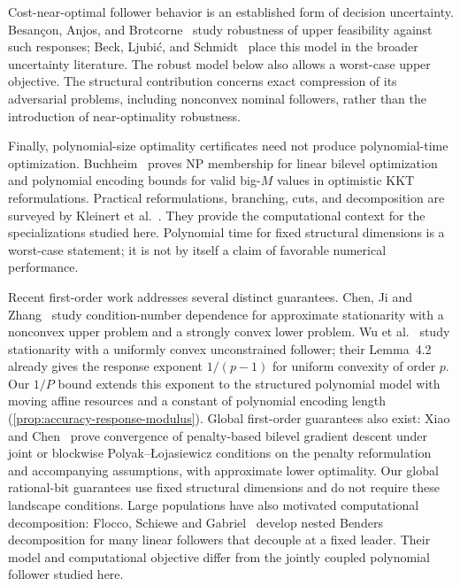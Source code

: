 Cost-near-optimal follower behavior is an established form of decision
uncertainty. Besan\c{c}on, Anjos, and Brotcorne~\cite{BesanconAnjosBrotcorne2024}
study robustness of upper feasibility against such responses;
Beck, Ljubi\'c, and Schmidt~\cite{BeckLjubicSchmidt2023} place this model in
the broader uncertainty literature. The robust model below also allows a
worst-case upper objective. The structural contribution concerns exact
compression of its adversarial problems, including nonconvex nominal
followers, rather than the introduction of near-optimality robustness.

Finally, polynomial-size optimality certificates need not produce
polynomial-time optimization. Buchheim~\cite{Buchheim2023} proves NP
membership for linear bilevel optimization and polynomial encoding bounds
for valid big-$M$ values in optimistic KKT reformulations. Practical
reformulations, branching, cuts, and decomposition are surveyed by
Kleinert et al.~\cite{KleinertEtAl2021}. They provide the computational
context for the specializations studied here. Polynomial time for fixed
structural dimensions is a worst-case statement; it is not by itself a
claim of favorable numerical performance.

Recent first-order work addresses several distinct guarantees. Chen, Ji and
Zhang~\cite{ChenJiZhang2026} study condition-number dependence for approximate
stationarity with a nonconvex upper problem and a strongly convex lower
problem. Wu et al.~\cite{WuEtAl2026} study stationarity with a uniformly
convex unconstrained follower; their Lemma~4.2 already gives the response
exponent $1/(p-1)$ for uniform convexity of order $p$. Our $1/P$ bound
extends this exponent to the structured polynomial model with moving affine
resources and a constant of polynomial encoding length
(\cref{prop:accuracy-response-modulus}). Global first-order guarantees also
exist: Xiao and Chen~\cite{XiaoChen2025} prove convergence of penalty-based
bilevel gradient descent under joint or blockwise Polyak--\L{}ojasiewicz
conditions on the penalty reformulation and accompanying assumptions,
with approximate lower optimality. Our global rational-bit guarantees use
fixed structural dimensions and do not require these landscape conditions.
Large populations have also motivated computational decomposition: Flocco,
Schiewe and Gabriel~\cite{FloccoEtAl2026} develop nested Benders decomposition
for many linear followers that decouple at a fixed leader. Their model and
computational objective differ from the jointly coupled polynomial follower
studied here.

